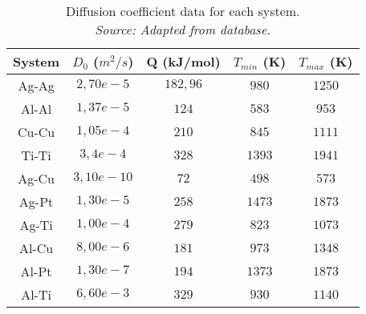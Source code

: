 \begin{table}[H]
    \centering
    \captionsetup{justification=centering}
    \begin{tabular}{ccccc}
        System & $D_0$ ($m^2/s$) & Q (kJ/mol) & $T_{min}$ (K) & $T_{max}$ (K) \\ \hline \hline
        Ag-Ag & $2,70e-5$ & $182,96$ & $980$ & $1250$\\
        Al-Al & $1,37e-5$ & $124$ & $583$ & $953$ \\
        Cu-Cu & $1,05e-4$ & $210$ & $845$ & $1111$\\
        Ti-Ti & $3,4e-4$ & $328$ & $1393$ & $1941$ \\
        Ag-Cu & $3,10e-10$ & $72$ & $498$ & $573$\\
        Ag-Pt & $1,30e-5$ & $258$ & $1473$ & $1873$\\
        Ag-Ti & $1,00e-4$ & $279$ & $823$ & $1073$ \\
        Al-Cu & $8,00e-6$ & $181$ & $973$ & $1348$ \\
        Al-Pt & $1,30e-7$ & $194$ & $1373$ & $1873$\\
        Al-Ti & $6,60e-3$ & $329$ & $930$ & $1140$
    \end{tabular}
    \caption{Diffusion coefficient data for each system. \\
    \textit{Source: Adapted from \citep{kakusan} database.}}
    \label{tab:tabla2}
\end{table}